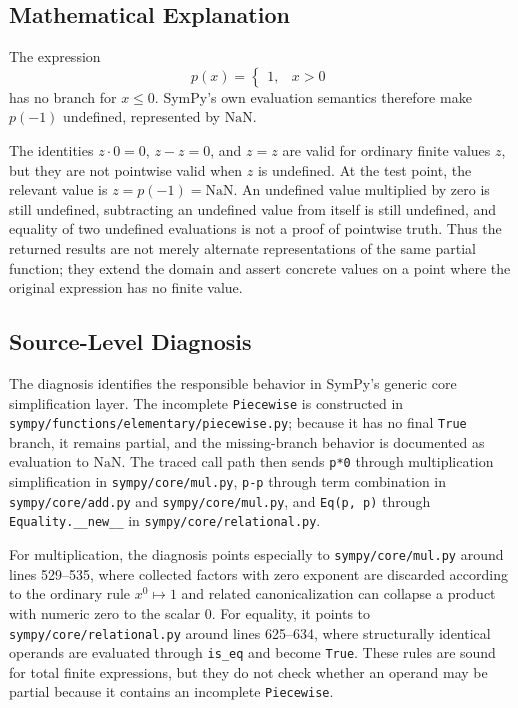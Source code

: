 \documentclass[11pt]{article}
\begin{document}
\subsection{Mathematical Explanation}

The expression
\[
  p(x) = \begin{cases}
    1, & x > 0
  \end{cases}
\]
has no branch for \(x \leq 0\).  SymPy's own evaluation semantics therefore make
\(p(-1)\) undefined, represented by \(\mathrm{NaN}\).

The identities \(z\cdot 0=0\), \(z-z=0\), and \(z=z\) are valid for ordinary
finite values \(z\), but they are not pointwise valid when \(z\) is undefined.
At the test point, the relevant value is \(z=p(-1)=\mathrm{NaN}\).  An
undefined value multiplied by zero is still undefined, subtracting an undefined
value from itself is still undefined, and equality of two undefined evaluations
is not a proof of pointwise truth.  Thus the returned results are not merely
alternate representations of the same partial function; they extend the domain
and assert concrete values on a point where the original expression has no
finite value.

\subsection{Source-Level Diagnosis}

The diagnosis identifies the responsible behavior in SymPy's generic core
simplification layer.  The incomplete \texttt{Piecewise} is constructed in
\nolinkurl{sympy/functions/elementary/piecewise.py}; because it has no final
\texttt{True} branch, it remains partial, and the missing-branch behavior is
documented as evaluation to \(\mathrm{NaN}\).  The traced call path then sends
\texttt{p*0} through multiplication simplification in
\nolinkurl{sympy/core/mul.py}, \texttt{p-p} through term combination in
\nolinkurl{sympy/core/add.py} and \nolinkurl{sympy/core/mul.py}, and
\texttt{Eq(p, p)} through \texttt{Equality.\_\_new\_\_} in
\nolinkurl{sympy/core/relational.py}.

For multiplication, the diagnosis points especially to
\nolinkurl{sympy/core/mul.py} around lines 529--535, where collected factors
with zero exponent are discarded according to the ordinary rule \(x^0\mapsto 1\)
and related canonicalization can collapse a product with numeric zero to the
scalar \(0\).  For equality, it points to
\nolinkurl{sympy/core/relational.py} around lines 625--634, where structurally
identical operands are evaluated through \texttt{is\_eq} and become
\texttt{True}.  These rules are sound for total finite expressions, but they do
not check whether an operand may be partial because it contains an incomplete
\texttt{Piecewise}.
\end{document}
